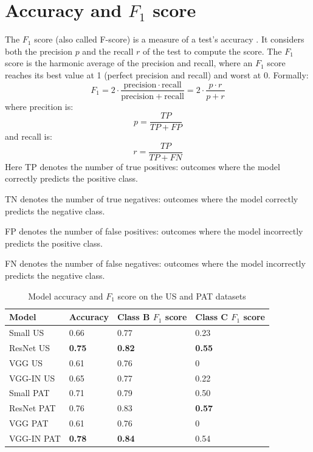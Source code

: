 \section{Accuracy and $F_1$ score}
\label{result_acc}

The $F_1$ score (also called F-score) is a measure of a test's accuracy \citep{powers2011evaluation}. It considers both the precision $p$ and the recall $r$ of the test to compute the score. The $F_1$ score is the harmonic average of the precision and recall, where an $F_1$ score reaches its best value at 1 (perfect precision and recall) and worst at 0.
Formally: 
\begin{equation}\label{f1_score}
    F_1 = 2 \cdot \frac{\mathrm{precision} \cdot \mathrm{recall}}{\mathrm{precision} + \mathrm{recall}} = 2 \cdot \frac{p \cdot r}{p+r}
\end{equation}
where precition is: $$p = \frac{TP}{TP + FP}$$
and recall is: $$r = \frac{TP}{TP + FN}$$
\noindent Here TP denotes the number of true positives: outcomes where the model correctly predicts the positive class.

\noindent TN denotes the number of true negatives: outcomes where the model correctly predicts the negative class.

\noindent FP denotes the number of false positives: outcomes where the model incorrectly predicts the positive class.

\noindent FN denotes the number of false negatives: outcomes where the model incorrectly predicts the negative class.

\begin{table}[h]
\centering
\begin{tabular}{ |p{4cm}||p{3cm}|p{3cm}|p{3cm}|  }
 \hline
 Model       & Accuracy & Class B $F_1$ score & Class C $F_1$ score\\
 \hline
 \hline
 Small  US   & 0.66  & 0.77 &  0.23\\
 ResNet US   & \textbf{0.75}  & \textbf{0.82} &  \textbf{0.55}\\
 VGG US      & 0.61  & 0.76 &  0\\
 VGG-IN US & 0.65 & 0.77 & 0.22 \\
\hline
 Small PAT   & 0.71  & 0.79 &  0.50\\
 ResNet PAT  & 0.76  & 0.83 &  \textbf{0.57}\\
 VGG PAT     & 0.61  & 0.76 &  0\\
 VGG-IN PAT & \textbf{0.78} & \textbf{0.84} & 0.54 \\
 \hline
\end{tabular}
\caption{Model accuracy and $F_1$ score on the US and PAT datasets}
\label{acctable}
\end{table}

